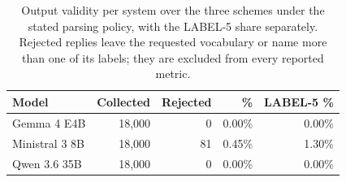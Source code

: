 \begin{table}[htbp]
\centering
\caption{Output validity per system over the three schemes under the stated parsing policy, with the LABEL-5 share separately. Rejected replies leave the requested vocabulary or name more than one of its labels; they are excluded from every reported metric.}
\label{tab:cdm_validity}
\small
\begin{tabular}{lrrrr}
\toprule
\textbf{Model} & \textbf{Collected} & \textbf{Rejected} & \textbf{\%} & \textbf{LABEL-5 \%} \\
\midrule
  Gemma 4 E4B & 18{,}000 & 0 & 0.00\% & 0.00\% \\
  Ministral 3 8B & 18{,}000 & 81 & 0.45\% & 1.30\% \\
  Qwen 3.6 35B & 18{,}000 & 0 & 0.00\% & 0.00\% \\
\bottomrule
\end{tabular}
\end{table}
